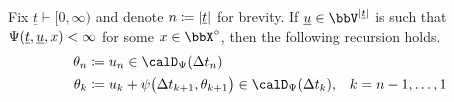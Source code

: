 \begin{proposition}
  \label{proposition:moment-to-twist}
  Fix $\underline t \vdash [0,\infty)$ and denote $n \coloneqq |\underline t|$ for brevity.
  If $\underline\momentVar \in \vecSpace^{|\underline t|}$ is such that $\Psi(\underline t, \underline{u}, x) < \infty$ for some $\stateVar \in \stateSpace^\circ$, then the following recursion holds.
  \begin{equation}
    \label{eq:moment-to-twist}
    \begin{aligned}
      \twistVar_n &\defeq \momentVar_n \in \momentSpace(\Delta t_n) \\
      \twistVar_k &\defeq \momentVar_k + \affPart\big(\Delta t_{k+1}, \twistVar_{k+1}\big) \in \momentSpace(\Delta t_k), & k = n-1, \ldots, 1
    \end{aligned}
  \end{equation}
\end{proposition}
